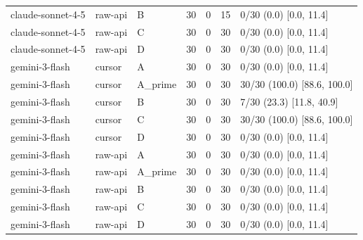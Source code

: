 \begin{center}
\begin{longtable}{@{}lllllll@{}}
claude-sonnet-4-5 & raw-api & B & 30 & 0 & 15 & 0/30 (0.0) [0.0, 11.4] \\
claude-sonnet-4-5 & raw-api & C & 30 & 0 & 30 & 0/30 (0.0) [0.0, 11.4] \\
claude-sonnet-4-5 & raw-api & D & 30 & 0 & 30 & 0/30 (0.0) [0.0, 11.4] \\
gemini-3-flash & cursor & A & 30 & 0 & 30 & 0/30 (0.0) [0.0, 11.4] \\
gemini-3-flash & cursor & A\_prime & 30 & 0 & 30 & 30/30 (100.0) [88.6, 100.0] \\
gemini-3-flash & cursor & B & 30 & 0 & 30 & 7/30 (23.3) [11.8, 40.9] \\
gemini-3-flash & cursor & C & 30 & 0 & 30 & 30/30 (100.0) [88.6, 100.0] \\
gemini-3-flash & cursor & D & 30 & 0 & 30 & 0/30 (0.0) [0.0, 11.4] \\
gemini-3-flash & raw-api & A & 30 & 0 & 30 & 0/30 (0.0) [0.0, 11.4] \\
gemini-3-flash & raw-api & A\_prime & 30 & 0 & 30 & 0/30 (0.0) [0.0, 11.4] \\
gemini-3-flash & raw-api & B & 30 & 0 & 30 & 0/30 (0.0) [0.0, 11.4] \\
gemini-3-flash & raw-api & C & 30 & 0 & 30 & 0/30 (0.0) [0.0, 11.4] \\
gemini-3-flash & raw-api & D & 30 & 0 & 30 & 0/30 (0.0) [0.0, 11.4] \\
\bottomrule
\end{longtable}\end{center}
